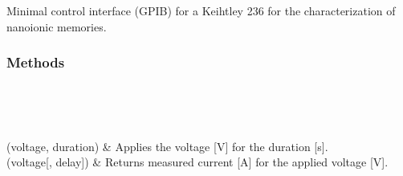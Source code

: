 \documentclass[letterpaper,10pt,english,openany,oneside]{sphinxmanual}
\begin{document}
\begin{fulllineitems}
\label{\detokenize{index:SimpleKeithley236.Keithley236.Keithley236}}
Minimal control interface (GPIB) for a Keihtley 236  for the
characterization of nano\sphinxhyphen{}ionic memories.
\subsubsection*{Methods}


\begin{savenotes}\sphinxatlongtablestart\begin{longtable}[c]{}
\hline

\endfirsthead

%
{}\\
\hline

\endhead

\hline
{}\\
\endfoot

\endlastfoot

(voltage, duration)
&
Applies the voltage {[}V{]} for the duration {[}s{]}.
\\
\hline
{}(voltage{[}, delay{]})
&
Returns measured current {[}A{]} for the applied voltage {[}V{]}.
\\
\hline
\end{longtable}\sphinxatlongtableend\end{savenotes}

\end{fulllineitems}




\renewcommand{\indexname}{Index}
\printindex
\end{document}
